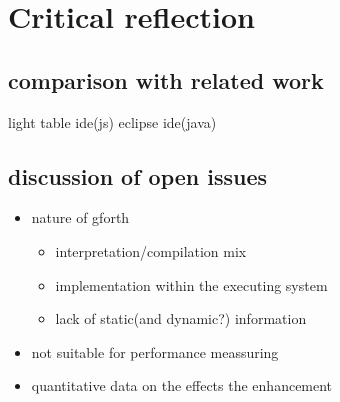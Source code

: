 \chapter{Critical reflection}

\section{comparison with related work}

light table ide(js)
eclipse ide(java)

\section{discussion of open issues}

\begin{itemize}
\item nature of gforth
\begin{itemize}
\item interpretation/compilation mix
\item implementation within the executing system
\item lack of static(and dynamic?) information
\end{itemize}
\item not suitable for performance meassuring
\item quantitative data on the effects the enhancement
\end{itemize}

